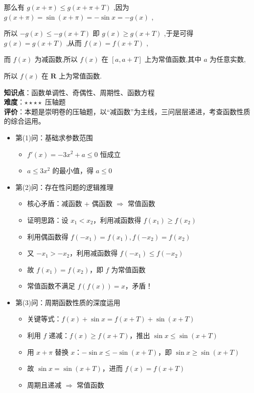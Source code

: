\documentclass[10pt]{article}
\begin{document}
那么有 \(g\left( {x + \pi }\right)  \leq  g\left( {x + \pi  + T}\right)\) ,因为 \(g\left( {x + \pi }\right)  = \sin \left( {x + \pi }\right)  =  - \sin x =  - g\left( x\right)\) ,

所以 \(- g\left( x\right)  \leq   - g\left( {x + T}\right)\) 即 \(g\left( x\right)  \geq  g\left( {x + T}\right)\) ,于是可得 \(g\left( x\right)  = g\left( {x + T}\right)\) ,从而 \(f\left( x\right)  = f\left( {x + T}\right)\) ,

而 \(f\left( x\right)\) 为减函数,所以 \(f\left( x\right)\) 在 \(\left\lbrack  {a,a + T}\right\rbrack\) 上为常值函数,其中 \(a\) 为任意实数,

所以 \(f\left( x\right)\) 在 \(\mathbf{R}\) 上为常值函数.

\begin{analysisbox}[考点分析]
\textbf{知识点}：函数单调性、奇偶性、周期性、函数方程\\
\textbf{难度}：\(\star\star\star\star\) 压轴题\\
\textbf{评价}：本题是崇明卷的压轴题，以``减函数''为主线，三问层层递进，考查函数性质的综合运用。
\begin{itemize}
\item 第(1)问：基础求参数范围
  \begin{itemize}
  \item \(f'(x) = -3x^2 + a \leq 0\) 恒成立
  \item \(a \leq 3x^2\) 的最小值，得 \(a \leq 0\)
  \end{itemize}
\item 第(2)问：存在性问题的逻辑推理
  \begin{itemize}
  \item 核心矛盾：减函数 + 偶函数 $\Rightarrow$ 常值函数
  \item 证明思路：设 \(x_1 < x_2\)，利用减函数得 \(f(x_1) \geq f(x_2)\)
  \item 利用偶函数得 \(f(-x_1) = f(x_1), f(-x_2) = f(x_2)\)
  \item 又 \(-x_1 > -x_2\)，利用减函数得 \(f(-x_1) \leq f(-x_2)\)
  \item 故 \(f(x_1) = f(x_2)\)，即 \(f\) 为常值函数
  \item 常值函数不满足 \(f(f(x)) = x\)，矛盾！
  \end{itemize}
\item 第(3)问：周期函数性质的深度运用
  \begin{itemize}
  \item 关键等式：\(f(x) + \sin x = f(x+T) + \sin(x+T)\)
  \item 利用 \(f\) 递减：\(f(x) \geq f(x+T)\)，推出 \(\sin x \leq \sin(x+T)\)
  \item 用 \(x+\pi\) 替换 \(x\)：\(-\sin x \leq -\sin(x+T)\)，即 \(\sin x \geq \sin(x+T)\)
  \item 故 \(\sin x = \sin(x+T)\)，进而 \(f(x) = f(x+T)\)
  \item 周期且递减 $\Rightarrow$ 常值函数
  \end{itemize}
\end{itemize}
\end{analysisbox}
\end{document}
